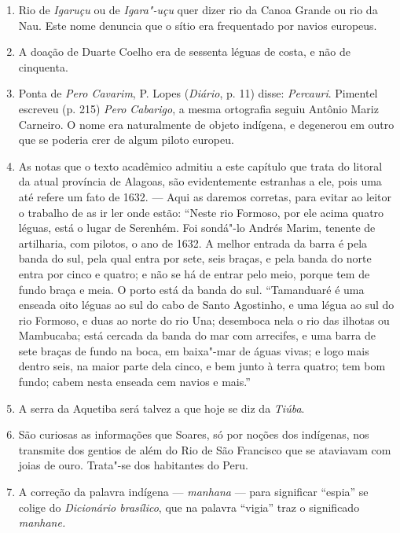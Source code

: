 \begin{enumerate}
\item Rio de \textit{Igaruçu} ou de \textit{Igara"-uçu} quer dizer rio da Canoa Grande ou rio da Nau. Este 
nome denuncia que o sítio era frequentado por navios europeus.

\item A doação de Duarte Coelho era de sessenta léguas de costa, e não de cinquenta.

\item Ponta de \textit{Pero Cavarim}, P. Lopes (\textit{Diário}, p. 11) disse: \textit{Percauri}. Pimentel 
escreveu (p. 215) \textit{Pero Cabarigo}, a mesma ortografia seguiu Antônio Mariz Carneiro. 
O nome era naturalmente de objeto indígena, e degenerou em outro que se poderia crer 
de algum piloto europeu.

\item As notas que o texto acadêmico admitiu a este capítulo que trata do litoral da atual 
província de Alagoas, são evidentemente estranhas a ele, pois uma até refere um fato de 
1632. --- Aqui as daremos corretas, para evitar ao leitor o trabalho de as ir ler onde 
estão: ``Neste rio Formoso, por ele acima quatro léguas, está o lugar de Serenhém. 
Foi sondá"-lo Andrés Marim, tenente de artilharia, com pilotos, o ano de 1632. A melhor entrada da 
barra é pela banda do sul, pela qual entra por sete, seis braças, e pela banda do norte entra 
por cinco e quatro; e não se há de entrar pelo meio, porque tem de fundo braça e meia. O 
porto está da banda do sul. ``Tamanduaré é uma enseada oito léguas ao sul do cabo de Santo Agostinho, e uma 
légua ao sul do rio Formoso, e duas ao norte do rio Una; desemboca nela o rio das ilhotas ou 
Mambucaba; está cercada da banda do mar com arrecifes, e uma barra de sete braças de 
fundo na boca, em baixa"-mar de águas vivas; e logo mais dentro seis, na maior parte dela 
cinco, e bem junto à terra quatro; tem bom fundo; cabem nesta enseada cem navios e mais.'' 

\item A serra da Aquetiba será talvez a que hoje se diz da \textit{Tiúba}.

\item São curiosas as informações que Soares, só por noções dos indígenas, nos transmite 
dos gentios de além do Rio de São Francisco que se ataviavam com joias de ouro. Trata"-se dos habitantes do Peru.

\item A correção da palavra indígena --- \textit{manhana} --- para significar ``espia'' se colige do 
\textit{Dicionário brasílico}, que na palavra ``vigia'' traz o significado \textit{manhane.}


\end{enumerate}
